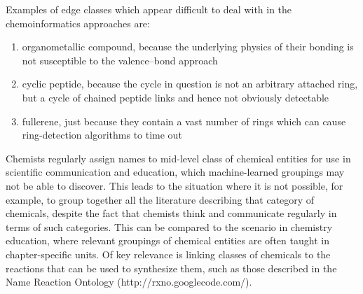 \documentclass[10pt]{bmc_article}
\newenvironment{bmcformat}{\baselineskip20pt\sloppy\setboolean{publ}{false}}{\baselineskip20pt\sloppy}
\begin{document}
\begin{bmcformat}
Examples of edge classes which appear difficult to deal with in the chemoinformatics approaches are:
\begin{enumerate}
  \item organometallic compound, because the underlying physics of their bonding is not susceptible to the valence--bond approach
	\item cyclic peptide, because the cycle in question is not an arbitrary attached ring, but a cycle of chained peptide links and hence not obviously detectable
	\item fullerene, just because they contain a vast number of rings which can cause ring-detection algorithms to time out
\end{enumerate}

Chemists regularly assign names to mid-level class of chemical entities for use in scientific communication and education, which machine-learned groupings may not be able to discover. This leads to the situation where it is not possible, for example, to group together all the literature describing that category of chemicals, despite the fact that chemists think and communicate regularly in terms of such categories.  This can be compared to the scenario in chemistry education, where relevant groupings of chemical entities are often taught in chapter-specific units. %
Of key relevance is linking classes of chemicals to the reactions that can be used to synthesize them, such as those described in the Name Reaction Ontology (http://rxno.googlecode.com/).


\end{bmcformat}
\end{document}
